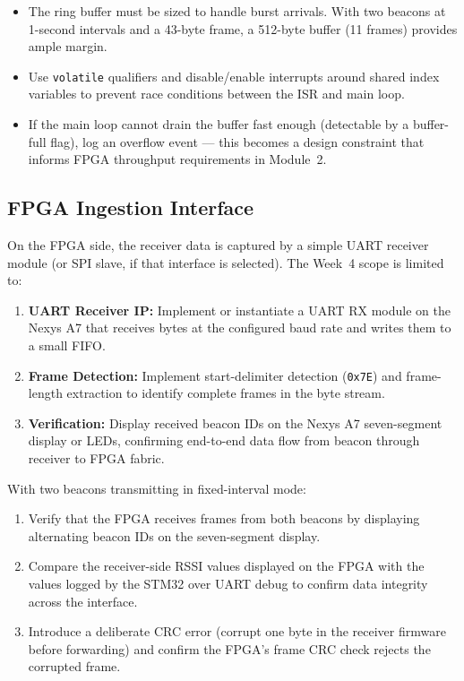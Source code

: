 \documentclass[11pt,letterpaper]{article}
\begin{document}
	\begin{tcolorbox}[warning={Concurrency Considerations}]
		\begin{itemize}
			\item The ring buffer must be sized to handle burst arrivals. With two beacons at 1-second intervals and a 43-byte frame, a 512-byte buffer (11 frames) provides ample margin.
			\item Use \texttt{volatile} qualifiers and disable/enable interrupts around shared index variables to prevent race conditions between the ISR and main loop.
			\item If the main loop cannot drain the buffer fast enough (detectable by a buffer-full flag), log an overflow event --- this becomes a design constraint that informs FPGA throughput requirements in Module~2.
		\end{itemize}
	\end{tcolorbox}
	
	\subsection{FPGA Ingestion Interface}
	
	On the FPGA side, the receiver data is captured by a simple UART receiver module (or SPI slave, if that interface is selected). The Week~4 scope is limited to:
	
	\begin{enumerate}[leftmargin=2em]
		\item \textbf{UART Receiver IP:} Implement or instantiate a UART RX module on the Nexys A7 that receives bytes at the configured baud rate and writes them to a small FIFO.
		\item \textbf{Frame Detection:} Implement start-delimiter detection (\texttt{0x7E}) and frame-length extraction to identify complete frames in the byte stream.
		\item \textbf{Verification:} Display received beacon IDs on the Nexys A7 seven-segment display or LEDs, confirming end-to-end data flow from beacon through receiver to FPGA fabric.
	\end{enumerate}
	
	\begin{tcolorbox}[infobox={Exercise: End-to-End Data Flow Validation}]
		With two beacons transmitting in fixed-interval mode:
		\begin{enumerate}
			\item Verify that the FPGA receives frames from both beacons by displaying alternating beacon IDs on the seven-segment display.
			\item Compare the receiver-side RSSI values displayed on the FPGA with the values logged by the STM32 over UART debug to confirm data integrity across the interface.
			\item Introduce a deliberate CRC error (corrupt one byte in the receiver firmware before forwarding) and confirm the FPGA's frame CRC check rejects the corrupted frame.
		\end{enumerate}
	\end{tcolorbox}
	
\end{document}
